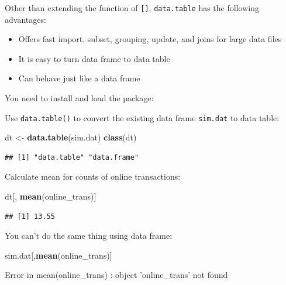 \documentclass[12pt,]{krantz}
\makeatletter
\newenvironment{Shaded}{\begin{snugshade}}{\end{snugshade}}
\newcommand{\KeywordTok}[1]{\textcolor[rgb]{0.27,0.27,0.27}{\textbf{#1}}}
\newcommand{\NormalTok}[1]{#1}
\newcommand{\StringTok}[1]{\textcolor[rgb]{0.5,0.5,0.5}{#1}}
\providecommand{\tightlist}{%
  \setlength{\itemsep}{0pt}\setlength{\parskip}{0pt}}
\newenvironment{kframe}{%
\medskip{}
\setlength{\fboxsep}{.8em}
 \def\at@end@of@kframe{}%
 \ifinner\ifhmode%
  \def\at@end@of@kframe{\end{minipage}}%
  \begin{minipage}{\columnwidth}%
 \fi\fi%
 \def\FrameCommand##1{\hskip\@totalleftmargin \hskip-\fboxsep
 \colorbox{shadecolor}{##1}\hskip-\fboxsep
     \hskip-\linewidth \hskip-\@totalleftmargin \hskip\columnwidth}%
 \MakeFramed {\advance\hsize-\width
   \@totalleftmargin\z@ \linewidth\hsize
   \@setminipage}}%
 {\par\unskip\endMakeFramed%
 \at@end@of@kframe}
\renewenvironment{Shaded}{\begin{kframe}}{\end{kframe}}
\makeatother
\begin{document}
Other than extending the function of \texttt{{[}{]}}, \texttt{data.table} has the following advantages:

\begin{itemize}
\tightlist
\item
  Offers fast import, subset, grouping, update, and joins for large data files
\item
  It is easy to turn data frame to data table
\item
  Can behave just like a data frame
\end{itemize}

You need to install and load the package:

Use \texttt{data.table()} to convert the existing data frame \texttt{sim.dat} to data table:

\begin{Shaded}
\begin{Highlighting}[]
\NormalTok{dt <-}\StringTok{ }\KeywordTok{data.table}\NormalTok{(sim.dat)}
\KeywordTok{class}\NormalTok{(dt)}
\end{Highlighting}
\end{Shaded}

\begin{verbatim}
## [1] "data.table" "data.frame"
\end{verbatim}

Calculate mean for counts of online transactions:

\begin{Shaded}
\begin{Highlighting}[]
\NormalTok{dt[, }\KeywordTok{mean}\NormalTok{(online_trans)]}
\end{Highlighting}
\end{Shaded}

\begin{verbatim}
## [1] 13.55
\end{verbatim}

You can't do the same thing using data frame:

\begin{Shaded}
\begin{Highlighting}[]
\NormalTok{sim.dat[,}\KeywordTok{mean}\NormalTok{(online_trans)]}
\end{Highlighting}
\end{Shaded}

\begin{Shaded}
\begin{Highlighting}[]
\NormalTok{Error in mean(online_trans) : object 'online_trans' not found}
\end{Highlighting}
\end{Shaded}
\end{document}
